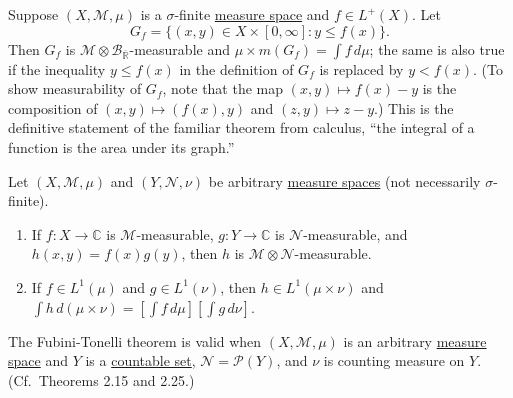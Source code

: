 	\begin{exercise}[Folland 2.50]
		Suppose $(X, \mathcal{M}, \mu)$ is a $\sigma$-finite \hyperref[def:measure-space]{measure space} and $f \in L^+(X)$. Let
		\begin{equation}
			G_f = \{(x, y) \in X \times [0, \infty] : y \le f(x)\}.
		\end{equation}
		Then $G_f$ is $\mathcal{M} \otimes \mathcal{B}_{\overline{\mathbb{R}}}$-measurable and $\mu \times m(G_f) = \int f \, d\mu$; the same is also true if the inequality $y \le f(x)$ in the definition of $G_f$ is replaced by $y < f(x)$. (To show measurability of $G_f$, note that the map $(x, y) \mapsto f(x) - y$ is the composition of $(x, y) \mapsto (f(x), y)$ and $(z, y) \mapsto z - y$.) This is the definitive statement of the familiar theorem from calculus, ``the integral of a function is the area under its graph.''
	\end{exercise}
	\begin{solution}

	\end{solution}

	\begin{exercise}[Folland 2.51]
		Let $(X, \mathcal{M}, \mu)$ and $(Y, \mathcal{N}, \nu)$ be arbitrary \hyperref[def:measure-space]{measure spaces} (not necessarily $\sigma$-finite).
		\begin{enumerate}[label=\textbf{\alph*.}]
			\item If $f : X \to \mathbb{C}$ is $\mathcal{M}$-measurable, $g : Y \to \mathbb{C}$ is $\mathcal{N}$-measurable, and $h(x, y) = f(x)g(y)$, then $h$ is $\mathcal{M} \otimes \mathcal{N}$-measurable.
			\item If $f \in L^1(\mu)$ and $g \in L^1(\nu)$, then $h \in L^1(\mu \times \nu)$ and $\int h \, d(\mu \times \nu) = [\int f \, d\mu][\int g \, d\nu]$.
		\end{enumerate}
	\end{exercise}
	\begin{solution}

	\end{solution}

	\begin{exercise}[Folland 2.52]
		The Fubini-Tonelli theorem is valid when $(X, \mathcal{M}, \mu)$ is an arbitrary \hyperref[def:measure-space]{measure space} and $Y$ is a \hyperref[st-def:countable]{countable set}, $\mathcal{N} = \mathcal{P}(Y)$, and $\nu$ is counting measure on $Y$. (Cf.\ Theorems 2.15 and 2.25.)
	\end{exercise}
	\begin{solution}

	\end{solution}

